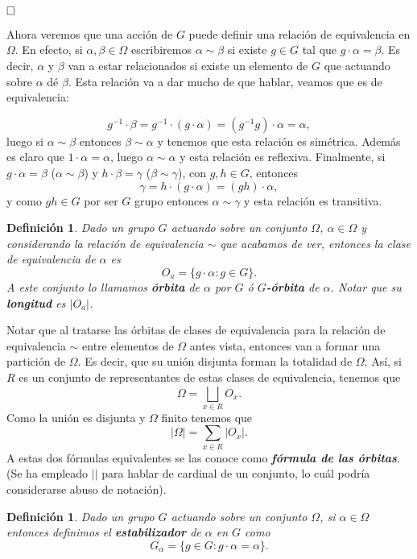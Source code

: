 \documentclass[12pt]{article}
\newtheorem{definition}[theorem]{Definición}
\begin{document}
$\hfill \square$

Ahora veremos que una acción de $G$ puede definir una relación de equivalencia en $\Omega$. En efecto, si $\alpha, \beta \in \Omega$ escribiremos $\alpha \sim \beta $ si existe $g \in G$ tal que $g \cdot \alpha = \beta$. Es decir, $\alpha$ y $\beta$ van a estar relacionados si existe un elemento de $G$ que actuando sobre $\alpha$ dé $\beta$. Esta relación va a dar mucho de que hablar, veamos que es de equivalencia:

$$g^{-1} \cdot \beta = g^{-1} \cdot (g \cdot \alpha ) = (g^{-1}g) \cdot \alpha = \alpha, $$ luego si $\alpha \sim \beta$ entonces $\beta \sim \alpha$ y tenemos que esta relación es simétrica. Además es claro que $1 \cdot \alpha = \alpha$, luego $\alpha \sim \alpha$ y esta relación es reflexiva. Finalmente, si $g \cdot \alpha = \beta$ ($\alpha \sim \beta$) y $h \cdot \beta = \gamma$ ($\beta \sim \gamma$), con $g, h \in G$, entonces $$\gamma = h \cdot (g \cdot \alpha) = (gh) \cdot \alpha,$$ y como $gh \in G$ por ser $G$ grupo entonces $\alpha \sim \gamma$ y esta relación es transitiva.

\begin{definition}Dado un grupo $G$ actuando sobre un conjunto $\Omega$, $\alpha \in \Omega$ y considerando la relación de equivalencia $\sim$ que acabamos de ver, entonces la clase de equivalencia de $\alpha$ es $$O_a = \lbrace g\cdot \alpha : g \in G \rbrace.$$ A este conjunto lo llamamos \textbf{órbita} de $\alpha$ por $G$ ó \textbf{$G$-órbita} de $\alpha$. Notar que su \textbf{longitud} es $|O_a|$.
\end{definition}

Notar que al tratarse las órbitas de clases de equivalencia para la relación de equivalencia $\sim$ entre elementos de $\Omega$ antes vista, entonces van a formar una partición de $\Omega.$ Es decir, que su unión disjunta forman la totalidad de $\Omega$. Así, si $R$ es un conjunto de representantes de estas clases de equivalencia, tenemos que $$\Omega = \bigsqcup_{x\in R} O_x.$$ Como la unión es disjunta y $\Omega$ finito tenemos que $$|\Omega | = \sum_{x\in R} |O_x|.$$ A estas dos fórmulas equivalentes se las conoce como \textbf{\textit{fórmula de las órbitas}}. (Se ha empleado $||$ para hablar de cardinal de un conjunto, lo cuál podría considerarse abuso de notación).

\begin{definition}Dado un grupo $G$ actuando sobre un conjunto $\Omega$, si $\alpha \in \Omega$ entonces definimos el \textbf{estabilizador} de $\alpha$ en $G$ como $$G_\alpha = \lbrace g \in G : g\cdot \alpha = \alpha \rbrace.$$
\end{definition}
\end{document}
